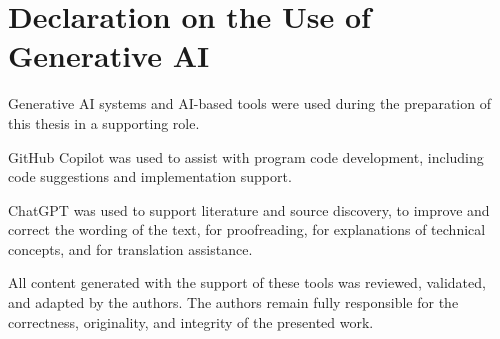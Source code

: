 \documentclass[
    11pt,                      %
    oneside,                  %
    english,                   %
    onehalfspacing,             %
    liststotoc,               %
    parskip,                  %
    headsepline,               %
    consistentlayout,          %
]{MastersDoctoralThesis}
\begin{document}










 

\cleardoublepage
\listoffigures

\cleardoublepage
\listoftables

\cleardoublepage
{}
{}
\lstlistoflistings

\cleardoublepage
{}
{}
\chapter*{Declaration on the Use of Generative AI}
Generative AI systems and AI-based tools were used during the preparation of this thesis in a supporting role.

GitHub Copilot was used to assist with program code development, including code suggestions and implementation support.

ChatGPT was used to support literature and source discovery, to improve and correct the wording of the text, for proofreading, for explanations of technical concepts, and for translation assistance.

All content generated with the support of these tools was reviewed, validated, and adapted by the authors. The authors remain fully responsible for the correctness, originality, and integrity of the presented work.




\printbibliography[heading=bibintoc]


\appendix %



%
%  
\end{document}
